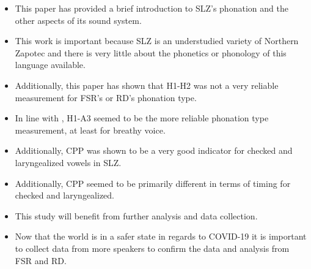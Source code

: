 \documentclass[12pt, letterpaper]{article}
\begin{document}
\begin{itemize}
	\item This paper has provided a brief introduction to SLZ's phonation and the other aspects of its sound system. 
	\item This work is important because SLZ is an understudied variety of Northern Zapotec and there is very little about the phonetics or phonology of this language available. 
	\item Additionally, this paper has shown that H1-H2 was not a very reliable measurement for FSR's or RD's phonation type. 
	\item In line with \citet{espositoVariationContrastivePhonation2010}, H1-A3 seemed to be the more reliable phonation type measurement, at least for breathy voice. 
	\item Additionally, CPP was shown to be a very good indicator for checked and laryngealized vowels in SLZ. 
	\item Additionally, CPP seemed to be primarily different in terms of timing for checked and laryngealized. 
	\item This study will benefit from further analysis and data collection. 
	\item Now that the world is in a safer state in regards to COVID-19 it is important to collect data from more speakers to confirm the data and analysis from FSR and RD.
\end{itemize}



\printbibliography[heading=bibintoc]
\end{document}
